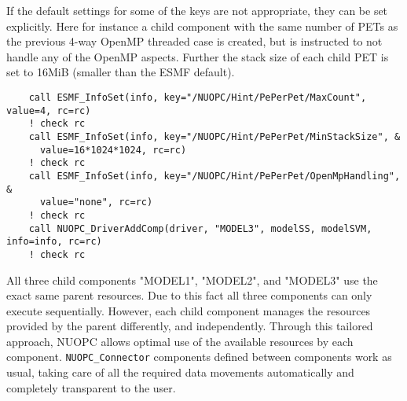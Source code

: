 If the default settings for some of the keys are not appropriate, they can be set explicitly. Here for instance a child component with the same number of PETs as the previous 4-way OpenMP threaded case is created, but is instructed to not handle any of the OpenMP aspects. Further the stack size of each child PET is set to 16MiB (smaller than the ESMF default).

\begin{verbatim}
    call ESMF_InfoSet(info, key="/NUOPC/Hint/PePerPet/MaxCount", value=4, rc=rc)
    ! check rc
    call ESMF_InfoSet(info, key="/NUOPC/Hint/PePerPet/MinStackSize", &
      value=16*1024*1024, rc=rc)
    ! check rc
    call ESMF_InfoSet(info, key="/NUOPC/Hint/PePerPet/OpenMpHandling", &
      value="none", rc=rc)
    ! check rc
    call NUOPC_DriverAddComp(driver, "MODEL3", modelSS, modelSVM, info=info, rc=rc)
    ! check rc
\end{verbatim}

All three child components "MODEL1", "MODEL2", and "MODEL3" use the exact same parent resources. Due to this fact all three components can only execute sequentially. However, each child component manages the resources provided by the parent differently, and independently. Through this tailored approach, NUOPC allows optimal use of the available resources by each component. {\tt NUOPC\_Connector} components defined between components work as usual, taking care of all the required data movements automatically and completely transparent to the user.
